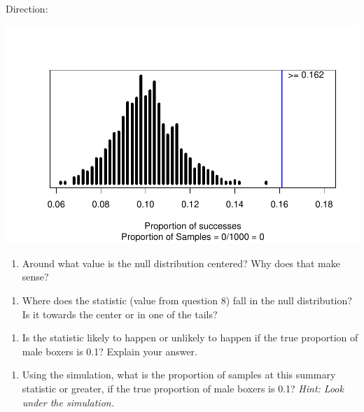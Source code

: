 \documentclass[
]{report}
\providecommand{\tightlist}{%
  \setlength{\itemsep}{0pt}\setlength{\parskip}{0pt}}
\begin{document}
\vspace{0.25in}

Direction:

\vspace{0.25in}

\begin{center}\includegraphics[width=0.7\linewidth]{06-inference-1cat_files/figure-latex/unnamed-chunk-4-1} \end{center}

\begin{enumerate}
\def\labelenumi{\arabic{enumi}.}
\setcounter{enumi}{18}
\tightlist
\item
  Around what value is the null distribution centered? Why does that make sense?
\end{enumerate}

\vspace{1in}

\begin{enumerate}
\def\labelenumi{\arabic{enumi}.}
\setcounter{enumi}{19}
\tightlist
\item
  Where does the statistic (value from question 8) fall in the null distribution? Is it towards the center or in one of the tails?
\end{enumerate}

\vspace{1in}

\begin{enumerate}
\def\labelenumi{\arabic{enumi}.}
\setcounter{enumi}{20}
\tightlist
\item
  Is the statistic likely to happen or unlikely to happen if the true proportion of male boxers is 0.1? Explain your answer.
\end{enumerate}

\vspace{1in}

\begin{enumerate}
\def\labelenumi{\arabic{enumi}.}
\setcounter{enumi}{21}
\tightlist
\item
  Using the simulation, what is the proportion of samples at this summary statistic or greater, if the true proportion of male boxers is 0.1? \emph{Hint: Look under the simulation.}
\end{enumerate}
\end{document}
